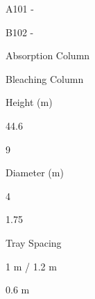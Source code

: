 \documentclass[a4paper,portrait,12pt]{article}
\begin{document}
\begin{flushleft}
A101 -
\end{flushleft}





\begin{flushleft}
B102 -
\end{flushleft}





\begin{flushleft}
Absorption Column
\end{flushleft}





\begin{flushleft}
Bleaching Column
\end{flushleft}





\begin{flushleft}
Height (m)
\end{flushleft}





44.6





9





\begin{flushleft}
Diameter (m)
\end{flushleft}





4





1.75





\begin{flushleft}
Tray Spacing
\end{flushleft}





\begin{flushleft}
1 m / 1.2 m
\end{flushleft}





\begin{flushleft}
0.6 m
\end{flushleft}
\end{document}
